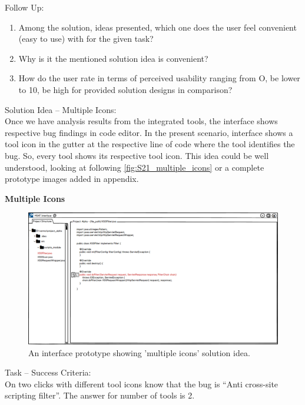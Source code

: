 Follow Up: \\

\begin{enumerate}
\item Among the solution, ideas presented, which one does the user feel convenient (easy to use) with for the given task?
\item Why is it the mentioned solution idea is convenient?
\item How do the user rate in terms of perceived usability ranging from O, be lower to 10, be high for provided solution designs in comparison?
\end{enumerate}

Solution Idea – Multiple Icons: \\

Once we have analysis results from the integrated tools, the interface shows respective bug findings in code editor. In the present scenario, interface shows a tool icon in the gutter at the respective line of code where the tool identifies the bug. So, every tool shows its respective tool icon. This idea could be well understood, looking at following \autoref{fig:S21_multiple_icons} or a complete prototype images added in appendix. \\

\clearpage

\textbf{Multiple Icons}
\begin{figure}[hbt!]
	\centering
	\includegraphics[width=\linewidth]{figures/solution_ideas_snaps/S21_multiple_icons}
	\caption{An interface prototype showing 'multiple icons' solution idea.}
	\label{fig:S21_multiple_icons}
\end{figure}

Task – Success Criteria: \\

On two clicks with different tool icons know that the bug is “Anti cross-site scripting filter”. The answer for number of tools is 2. \\

